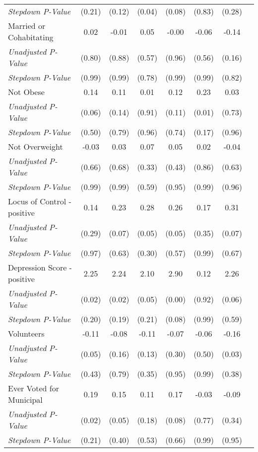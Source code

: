 \begin{tabular}{l c c c c c c c}
\quad \textit{Stepdown P-Value} & (0.21) & (0.12) & (0.04) & (0.08) & (0.83) & (0.28) \\
Married or Cohabitating & 0.02 & -0.01 & 0.05 & -0.00 & -0.06 & -0.14 \\
\quad \textit{Unadjusted P-Value} & (0.80) & (0.88) & (0.57) & (0.96) & (0.56) & (0.16) \\
\quad \textit{Stepdown P-Value} & (0.99) & (0.99) & (0.78) & (0.99) & (0.99) & (0.82) \\
Not Obese & 0.14 & 0.11 & 0.01 & 0.12 & 0.23 & 0.03 \\
\quad \textit{Unadjusted P-Value} & (0.06) & (0.14) & (0.91) & (0.11) & (0.01) & (0.73) \\
\quad \textit{Stepdown P-Value} & (0.50) & (0.79) & (0.96) & (0.74) & (0.17) & (0.96) \\
Not Overweight & -0.03 & 0.03 & 0.07 & 0.05 & 0.02 & -0.04 \\
\quad \textit{Unadjusted P-Value} & (0.66) & (0.68) & (0.33) & (0.43) & (0.86) & (0.63) \\
\quad \textit{Stepdown P-Value} & (0.99) & (0.99) & (0.59) & (0.95) & (0.99) & (0.96) \\
Locus of Control - positive & 0.14 & 0.23 & 0.28 & 0.26 & 0.17 & 0.31 \\
\quad \textit{Unadjusted P-Value} & (0.29) & (0.07) & (0.05) & (0.05) & (0.35) & (0.07) \\
\quad \textit{Stepdown P-Value} & (0.97) & (0.63) & (0.30) & (0.57) & (0.99) & (0.67) \\
Depression Score - positive & 2.25 & 2.24 & 2.10 & 2.90 & 0.12 & 2.26 \\
\quad \textit{Unadjusted P-Value} & (0.02) & (0.02) & (0.05) & (0.00) & (0.92) & (0.06) \\
\quad \textit{Stepdown P-Value} & (0.20) & (0.19) & (0.21) & (0.08) & (0.99) & (0.59) \\
Volunteers & -0.11 & -0.08 & -0.11 & -0.07 & -0.06 & -0.16 \\
\quad \textit{Unadjusted P-Value} & (0.05) & (0.16) & (0.13) & (0.30) & (0.50) & (0.03) \\
\quad \textit{Stepdown P-Value} & (0.43) & (0.79) & (0.35) & (0.95) & (0.99) & (0.38) \\
Ever Voted for Municipal & 0.19 & 0.15 & 0.11 & 0.17 & -0.03 & -0.09 \\
\quad \textit{Unadjusted P-Value} & (0.02) & (0.05) & (0.18) & (0.08) & (0.77) & (0.34) \\
\quad \textit{Stepdown P-Value} & (0.21) & (0.40) & (0.53) & (0.66) & (0.99) & (0.95) \\

\end{tabular}
